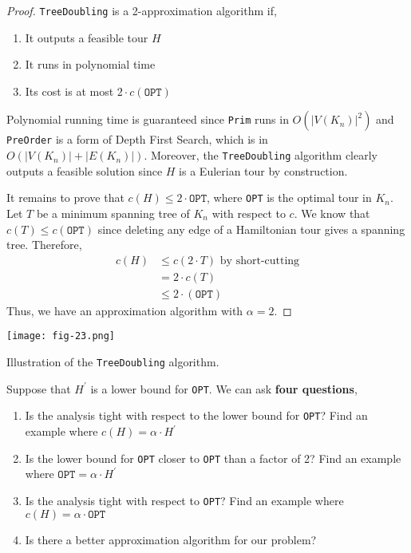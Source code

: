 \begin{proof}
 	\texttt{TreeDoubling} is a 2-approximation algorithm if,
	\begin{enumerate}
		\item It outputs a feasible tour $H$
		\item It runs in polynomial time
		\item Its cost is at most $2 \cdot c(\texttt{OPT})$
	\end{enumerate}

	\noindent Polynomial running time is guaranteed since \texttt{Prim} runs in $O(|V(K_n)|^2)$ and \texttt{PreOrder} is a form of Depth First Search, which is in $O(|V(K_n)| + |E(K_n)|)$. Moreover, the \texttt{TreeDoubling} algorithm clearly outputs a feasible solution since $H$ is a Eulerian tour by construction.

	It remains to prove that $c(H) \leq 2 \cdot \texttt{OPT}$, where \texttt{OPT} is the optimal tour in $K_n$. Let $T$ be a minimum spanning tree of $K_n$ with respect to $c$. We know that $c(T) \leq c(\texttt{OPT})$ since deleting any edge of a Hamiltonian tour gives a spanning tree. Therefore,
	\begin{align*}
		c(H) &\leq c(2 \cdot T) \text{ by short-cutting} \\
			 &= 2 \cdot c(T) \\
			 &\leq 2 \cdot (\texttt{OPT})
	\end{align*}
	\noindent Thus, we have an approximation algorithm with $\alpha = 2$.
\end{proof}

\begin{marginfigure}
	\texttt{[image: fig-23.png]}
	\caption{Illustration of the \texttt{TreeDoubling} algorithm.}
\end{marginfigure}

\begin{marginfigure}
	Suppose that  $H^{\prime}$ is a lower bound for \texttt{OPT}. We can ask \textbf{four questions},
	\begin{enumerate}
		\item Is the analysis tight with respect to the lower bound for \texttt{OPT}? Find an example where $c(H) = \alpha \cdot H^{\prime}$
		\item Is the lower bound for \texttt{OPT} closer to \texttt{OPT} than a factor of 2? Find an example where $\texttt{OPT} = \alpha \cdot  H^{\prime}$
		\item Is the analysis tight with respect to \texttt{OPT}? Find an example where $c(H) = \alpha \cdot \texttt{OPT}$
		\item Is there a better approximation algorithm for our problem?
	\end{enumerate}
\end{marginfigure}

